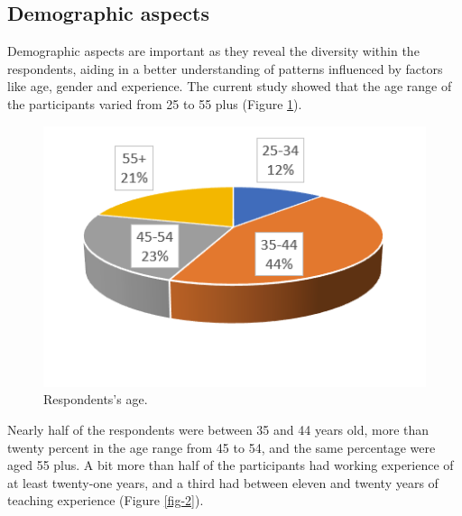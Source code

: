 \documentclass[english]{textolivre}
\begin{document}
\subsection{Demographic aspects}
Demographic aspects are important as they reveal the diversity within the respondents, aiding in a better understanding of patterns influenced by factors like age, gender and experience. The current study showed that the age range of the participants varied from 25 to 55 plus (Figure \ref{fig-1}).

\begin{figure}[h!]
    \centering
    \begin{minipage}{0.65\linewidth}
    \includegraphics[width=\linewidth]{Imagens/Figure1.png}
    \caption{Respondents’s age.}
    \label{fig-1}
    \end{minipage}
\end{figure}

Nearly half of the respondents were between 35 and 44 years old, more than twenty percent in the age range from 45 to 54, and the same percentage were aged 55 plus. A bit more than half of the participants had working experience of at least twenty-one years, and a third had between eleven and twenty years of teaching experience (Figure \ref{fig-2}).
\end{document}
